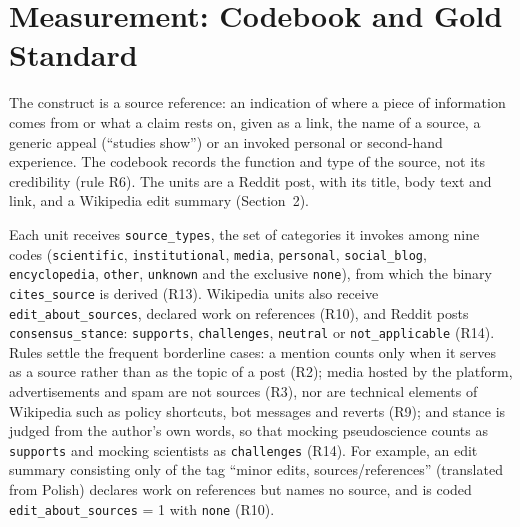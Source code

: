 \documentclass[10pt,a4paper]{article}
\newcommand{\kod}[1]{\texttt{#1}}
\newcommand{\szeroka}[1]{\resizebox{\linewidth}{!}{}}
\begin{document}
\begin{table}[htbp]
\centering
\caption{Sampling frames, gold-standard sample and annotator agreement in the pilot.}
\label{tab:dane}
\szeroka{preprint_data}
\end{table}

\section{Measurement: Codebook and Gold Standard}

The construct is a source reference: an indication of where a piece of information comes
from or what a claim rests on, given as a link, the name of a source, a generic appeal
(``studies show'') or an invoked personal or second-hand experience. The codebook records
the function and type of the source, not its credibility (rule R6). The units are a Reddit
post, with its title, body text and link, and a Wikipedia edit summary (Section~2).

Each unit receives \kod{source\_types}, the set of categories it invokes among nine codes
(\kod{scientific}, \kod{institutional}, \kod{media}, \kod{personal}, \kod{social\_blog},
\kod{encyclopedia}, \kod{other}, \kod{unknown} and the exclusive \kod{none}), from which
the binary \kod{cites\_source} is derived (R13). Wikipedia units also receive
\kod{edit\_about\_sources}, declared work on references (R10), and Reddit posts
\kod{consensus\_stance}: \kod{supports}, \kod{challenges}, \kod{neutral} or
\kod{not\_applicable} (R14). Rules settle the frequent borderline cases: a mention counts
only when it serves as a source rather than as the topic of a post (R2); media hosted by
the platform, advertisements and spam are not sources (R3), nor are technical elements of
Wikipedia such as policy shortcuts, bot messages and reverts (R9); and stance is judged
from the author's own words, so that mocking pseudoscience counts as \kod{supports} and
mocking scientists as \kod{challenges} (R14).
For example, an edit summary consisting only of the tag ``minor edits, sources/references''
(translated from Polish) declares work on references but names no source, and is coded
\kod{edit\_about\_sources} = 1 with \kod{none} (R10).
\end{document}
